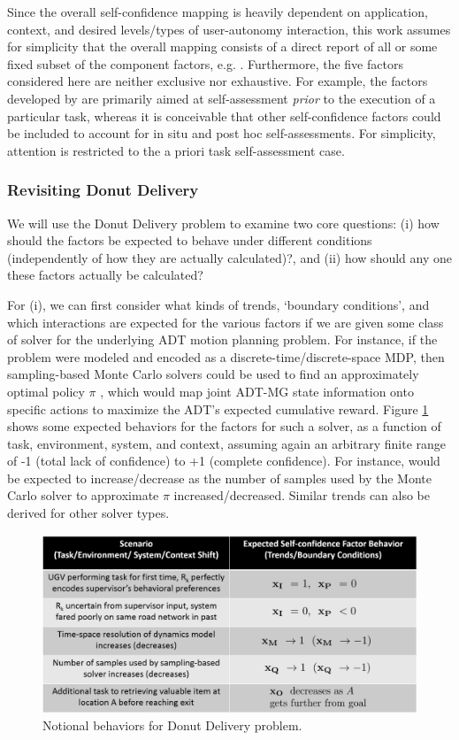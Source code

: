     Since the overall self-confidence mapping is heavily dependent on application, context, and desired levels/types of user-autonomy interaction, this work assumes for simplicity that the overall mapping consists of a direct report of all or some fixed subset of the component factors, e.g. \xSC. 
    Furthermore, the five factors considered here are neither exclusive nor exhaustive. For example, the factors developed by \cite{Aitken2016-cv,Aitken2016-fb} are primarily aimed at self-assessment \emph{prior} to the execution of a particular task, whereas it is conceivable that other self-confidence factors could be included to account for in situ and post hoc self-assessments. For simplicity, attention is restricted to the a priori task self-assessment case. 

\subsubsection{Revisiting Donut Delivery}
We will use the Donut Delivery problem to examine two core questions: (i) how should the factors be expected to behave under different conditions (independently of how they are actually calculated)?, and (ii) how should any one these factors actually be calculated?

For (i), we can first consider what kinds of trends, `boundary conditions', and which interactions are expected for the various factors if we are given some class of solver for the underlying ADT motion planning problem. For instance, if the problem were modeled and encoded as a discrete-time/discrete-space MDP, then sampling-based Monte Carlo solvers could be used to find an approximately optimal policy $\pi$ \cite{Browne2012-lj}, which would map joint ADT-MG state information onto specific actions to maximize the ADT's expected cumulative reward. Figure \ref{fig:trendsBCs} shows some expected behaviors for the \famsec{} factors for such a solver, as a function of task, environment, system, and context, assuming again an arbitrary finite range of -1 (total lack of confidence) to +1 (complete confidence). For instance, \xQ{} would be expected to increase/decrease as the number of samples used by the Monte Carlo solver to approximate $\pi$ increased/decreased. Similar trends can also be derived for other solver types.  %
\begin{figure}[tbp]
    \centering
    \includegraphics[width=0.65\linewidth]{Figures/scTrendsBoundaryExample_2generic.png}
    \caption{Notional \famsec{} behaviors for Donut Delivery problem.}
    \label{fig:trendsBCs}
\end{figure}


